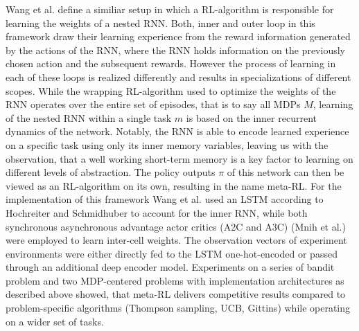 \documentclass[letterpaper, 10 pt, conference]{ieeeconf}  %
\begin{document}
Wang et al.\cite{wangLearningReinforcementLearn2016} define a similiar setup in which a RL-algorithm is responsible for 
learning the weights of a nested RNN. Both, inner and outer loop 
in this framework draw their learning experience from the reward information generated by the actions of the RNN, where 
the RNN holds information on the previously chosen action and the subsequent rewards. However the process of learning
in each of these loops is realized differently and results in specializations of different scopes. While the wrapping RL-algorithm used to 
optimize the weights of the RNN operates over the entire set of episodes, that is to say all MDPs $M$, learning of the nested RNN 
within a single task $m$ is based on the inner recurrent dynamics of the network. Notably, the RNN 
is able to encode learned experience on a specific task using only its inner memory variables, leaving us with the observation,
that a well working short-term memory is a key factor to learning on different levels of abstraction. 
The policy outputs $\pi$ of this network can then
be viewed as an RL-algorithm on its own, resulting in the name meta-RL. For the implementation of this framework Wang et al.
\cite{wangLearningReinforcementLearn2016} 
used an LSTM according to Hochreiter and Schmidhuber \cite{hochreiterLongShortTermMemory1997} to account for the inner RNN, while both synchronous 
asynchronous advantage actor critics (A2C and A3C) (Mnih et al.) were employed to learn inter-cell weights.
The observation vectors of experiment environments
were either directly fed to the LSTM one-hot-encoded or passed through an additional deep encoder model\cite{wangLearningReinforcementLearn2016}. 
Experiments on a series of bandit problem and two
MDP-centered problems with implementation architectures as described above showed, that meta-RL delivers 
competitive results compared to problem-specific algorithms (Thompson sampling, UCB, Gittins) while operating on a 
wider set of tasks. \newline
\end{document}
